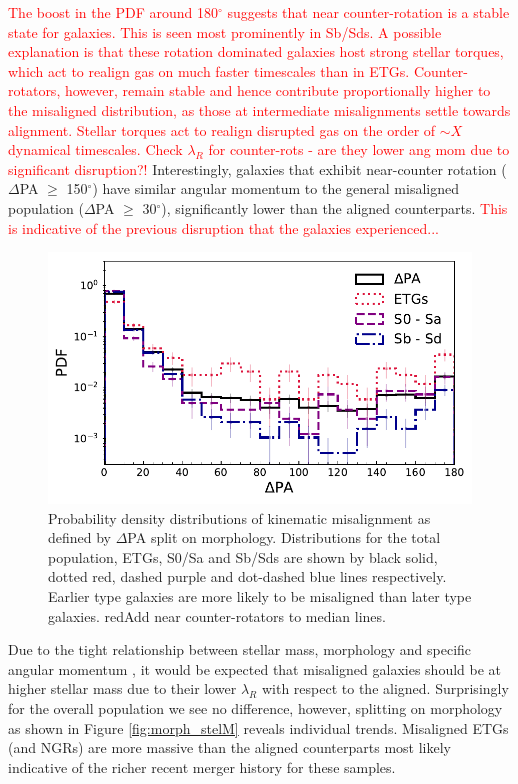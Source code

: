 \documentclass[fleqn,usenatbib]{mnras}
\newcommand{\red}[1]{{\textcolor{red}{#1}}}
\begin{document}
\red{The boost in the PDF around 180$^{\circ}$ suggests that near counter-rotation is a stable state for galaxies. This is seen most prominently in Sb/Sds. A possible explanation is that these rotation dominated galaxies host strong stellar torques, which act to realign gas on much faster timescales than in ETGs. Counter-rotators, however, remain stable and hence contribute proportionally higher to the misaligned distribution, as those at intermediate misalignments settle towards alignment. Stellar torques act to realign disrupted gas on the order of $\sim X$ dynamical timescales. Check $\lambda_{R}$ for counter-rots - are they lower ang mom due to significant disruption?!} Interestingly, galaxies that exhibit near-counter rotation ($\Delta$PA $\geq$ 150$^{\circ}$) have similar angular momentum to the general misaligned population ($\Delta$PA $\geq$ 30$^{\circ}$), significantly lower than the aligned counterparts. \red{This is indicative of the previous disruption that the galaxies experienced...}

\begin{figure}
	\includegraphics[width=\linewidth]{morph/delPA_morph.pdf}
    \caption{Probability density distributions of kinematic misalignment as defined by $\Delta$PA split on morphology. Distributions for the total population, ETGs, S0/Sa and Sb/Sds are shown by black solid, dotted red, dashed purple and dot-dashed blue lines respectively. Earlier type galaxies are more likely to be misaligned than later type galaxies. red{Add near counter-rotators to median lines.}}
    \label{fig:morph_PA}
\end{figure}

Due to the tight relationship between stellar mass, morphology and specific angular momentum \citep[e.g. see;]{cortese2016}, it would be expected that misaligned galaxies should be at higher stellar mass due to their lower $\lambda_{R}$ with respect to the aligned. Surprisingly for the overall population we see no difference, however, splitting on morphology as shown in Figure \ref{fig:morph_stelM} reveals individual trends. Misaligned ETGs (and NGRs) are more massive than the aligned counterparts most likely indicative of the richer recent merger history for these samples. 
\end{document}
